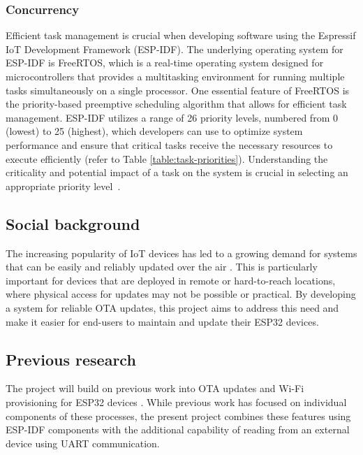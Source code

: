 \subsubsection{Concurrency}
\label{subsec:concurrency}
Efficient task management is crucial when developing software using the Espressif IoT Development Framework (ESP-IDF). The underlying operating system for ESP-IDF is FreeRTOS, which is a real-time operating system designed for microcontrollers that provides a multitasking environment for running multiple tasks simultaneously on a single processor. One essential feature of FreeRTOS is the priority-based preemptive scheduling algorithm that allows for efficient task management. ESP-IDF utilizes a range of 26 priority levels, numbered from 0 (lowest) to 25 (highest), which developers can use to optimize system performance and ensure that critical tasks receive the necessary resources to execute efficiently (refer to Table \ref{table:task-priorities}). Understanding the criticality and potential impact of a task on the system is crucial in selecting an appropriate priority level~\cite{Davis:2016}.

\subsection{Social background}
\label{sec:social}
The increasing popularity of IoT devices has led to a growing demand for systems that can be easily and reliably updated over the air \cite{Villegas:2019}. This is particularly important for devices that are deployed in remote or hard-to-reach locations, where physical access for updates may not be possible or practical. By developing a system for reliable OTA updates, this project aims to address this need and make it easier for end-users to maintain and update their ESP32 devices.

\subsection{Previous research}
\label{sec:previous}
The project will build on previous work into OTA updates and Wi-Fi provisioning for ESP32 devices \cite{espressif:esp-idf-programming-guide}. While previous work has focused on individual components of these processes, the present project combines these features using ESP-IDF components with the additional capability of reading from an external device using UART communication.